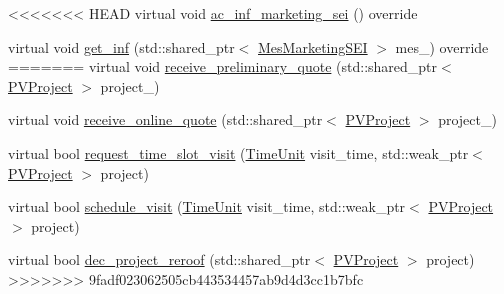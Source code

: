 {\bf }\par
\begin{DoxyCompactItemize}
\item 
<<<<<<< HEAD
virtual void \hyperlink{classsolar__core_1_1_household_add38a49b76c2836a50a89e75318414f1}{ac\+\_\+inf\+\_\+marketing\+\_\+sei} () override
\item 
virtual void \hyperlink{classsolar__core_1_1_household_ac9d26af7b52f0cdc357fc5dca4b86ad9}{get\+\_\+inf} (std\+::shared\+\_\+ptr$<$ \hyperlink{classsolar__core_1_1_mes_marketing_s_e_i}{Mes\+Marketing\+S\+E\+I} $>$ mes\+\_\+) override
=======
virtual void \hyperlink{classsolar__core_1_1_household_a31a1c8d006fb9e95a2460aa392eaa830}{receive\+\_\+preliminary\+\_\+quote} (std\+::shared\+\_\+ptr$<$ \hyperlink{classsolar__core_1_1_p_v_project}{P\+V\+Project} $>$ project\+\_\+)
\item 
virtual void \hyperlink{classsolar__core_1_1_household_a306aed410a39e8062ab5f1b4a3216b8b}{receive\+\_\+online\+\_\+quote} (std\+::shared\+\_\+ptr$<$ \hyperlink{classsolar__core_1_1_p_v_project}{P\+V\+Project} $>$ project\+\_\+)
\item 
virtual bool \hyperlink{classsolar__core_1_1_household_a8c9635bac11c9bd93e65dbb5be5b9d85}{request\+\_\+time\+\_\+slot\+\_\+visit} (\hyperlink{namespacesolar__core_a4b5949d07259da6f8a20d12a30403e90}{Time\+Unit} visit\+\_\+time, std\+::weak\+\_\+ptr$<$ \hyperlink{classsolar__core_1_1_p_v_project}{P\+V\+Project} $>$ project)
\item 
virtual bool \hyperlink{classsolar__core_1_1_household_a8d4b9c4a5cf59c93f33489eccbfba7db}{schedule\+\_\+visit} (\hyperlink{namespacesolar__core_a4b5949d07259da6f8a20d12a30403e90}{Time\+Unit} visit\+\_\+time, std\+::weak\+\_\+ptr$<$ \hyperlink{classsolar__core_1_1_p_v_project}{P\+V\+Project} $>$ project)
\item 
virtual bool \hyperlink{classsolar__core_1_1_household_aa63241ca3fcc1f2374d10b5c7f44124a}{dec\+\_\+project\+\_\+reroof} (std\+::shared\+\_\+ptr$<$ \hyperlink{classsolar__core_1_1_p_v_project}{P\+V\+Project} $>$ project)
>>>>>>> 9fadf023062505cb443534457ab9d4d3cc1b7bfc
\end{DoxyCompactItemize}

